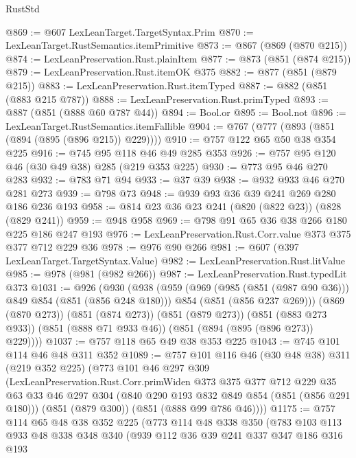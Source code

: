 \begin{lexlean}{RustStd}
\begin{coremodule}
@869 := @607 LexLeanTarget.TargetSyntax.Prim
@870 := LexLeanTarget.RustSemantics.itemPrimitive
@873 := @867 (@869 (@870 @215))
@874 := LexLeanPreservation.Rust.plainItem
@877 := @873 (@851 (@874 @215))
@879 := LexLeanPreservation.Rust.itemOK @375
@882 := @877 (@851 (@879 @215))
@883 := LexLeanPreservation.Rust.itemTyped
@887 := @882 (@851 (@883 @215 @787))
@888 := LexLeanPreservation.Rust.primTyped
@893 := @887 (@851 (@888 @60 @787 @44))
@894 := Bool.or
@895 := Bool.not
@896 := LexLeanTarget.RustSemantics.itemFallible
@904 := @767 (@777 (@893 (@851 (@894 (@895 (@896 @215)) @229))))
@910 := @757 @122 @65 @50 @38 @354 @225
@916 := @745 @95 @118 @46 @49 @285 @353
@926 := @757 @95 @120 @46 (@30 @49 @38) @285 (@219 @353 @225)
@930 := @773 @95 @46 @270 @283
@932 := @783 @71 @94
@933 := @37 @39
@938 := @932 @933 @46 @270 @281 @273
@939 := @798 @73
@948 := @939 @93 @36 @39 @241 @269 @280 @186 @236 @193
@958 := @814 @23 @36 @23 @241 (@820 (@822 @23)) (@828 (@829 @241))
@959 := @948 @958
@969 := @798 @91 @65 @36 @38 @266 @180 @225 @186 @247 @193
@976 := LexLeanPreservation.Rust.Corr.value @373 @375 @377 @712 @229 @36
@978 := @976 @90 @266
@981 := @607 (@397 LexLeanTarget.TargetSyntax.Value)
@982 := LexLeanPreservation.Rust.litValue
@985 := @978 (@981 (@982 @266))
@987 := LexLeanPreservation.Rust.typedLit @373
@1031 := @926
    (@930
      (@938
        (@959
          (@969 (@985 (@851 (@987 @90 @36))) @849 @854 (@851 (@856 @248 @180)))
          @854
          (@851 (@856 @237 @269)))
        (@869 (@870 @273))
        (@851 (@874 @273))
        (@851 (@879 @273))
        (@851 (@883 @273 @933))
        (@851 (@888 @71 @933 @46))
        (@851 (@894 (@895 (@896 @273)) @229))))
@1037 := @757 @118 @65 @49 @38 @353 @225
@1043 := @745 @101 @114 @46 @48 @311 @352
@1089 := @757
    @101
    @116
    @46
    (@30 @48 @38)
    @311
    (@219 @352 @225)
    (@773
      @101
      @46
      @297
      @309
      (LexLeanPreservation.Rust.Corr.primWiden
        @373
        @375
        @377
        @712
        @229
        @35
        @63
        @33
        @46
        @297
        @304
        (@840 @290 @193 @832 @849 @854 (@851 (@856 @291 @180)))
        (@851 (@879 @300))
        (@851 (@888 @99 @786 @46))))
@1175 := @757
    @114
    @65
    @48
    @38
    @352
    @225
    (@773
      @114
      @48
      @338
      @350
      (@783
        @103
        @113
        @933
        @48
        @338
        @348
        @340
        (@939
          @112
          @36
          @39
          @241
          @337
          @347
          @186
          @316
          @193

\end{coremodule}
\end{lexlean}
